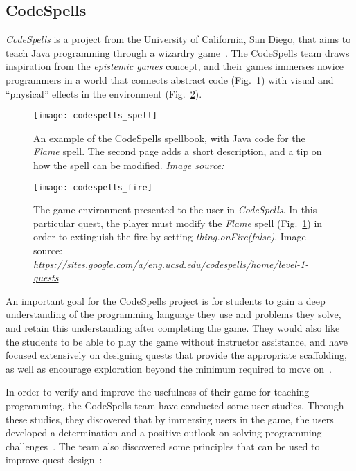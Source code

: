 \subsection{CodeSpells}
\label{sec:codespells}
\emph{CodeSpells} is a project from the University of California, San Diego, that aims to teach Java programming through a wizardry game~\cite{esper:codespells}. The CodeSpells team draws inspiration from the \emph{epistemic games} concept, and their games immerses novice programmers in a world that connects abstract code (Fig.~\ref{fig:codespells_spell}) with visual and ``physical'' effects in the environment (Fig.~\ref{fig:codespells_fire}).

\begin{figure}[htp]
	\centering
	\texttt{[image: codespells\_spell]}
	\caption[Java code for a CodeSpells spell]{An example of the CodeSpells spellbook, with Java code for the \emph{Flame} spell. The second page adds a short description, and a tip on how the spell can be modified. \emph{Image source:~\cite{esper:codespells}}}
	\label{fig:codespells_spell}
\end{figure}

\begin{figure}[htp]
	\centering
	\texttt{[image: codespells\_fire]}
	\caption[The CodeSpells game environment]{The game environment presented to the user in \emph{CodeSpells}. In this particular quest, the player must modify the \emph{Flame} spell (Fig.~\ref{fig:codespells_spell}) in order to extinguish the fire by setting \emph{thing.onFire(false)}. Image source: \emph{\url{https://sites.google.com/a/eng.ucsd.edu/codespells/home/level-1-quests}}}
	\label{fig:codespells_fire}
\end{figure}

\noindent
An important goal for the CodeSpells project is for students to gain a deep understanding of the programming language they use and problems they solve, and retain this understanding after completing the game. They would also like the students to be able to play the game without instructor assistance, and have focused extensively on designing quests that provide the appropriate scaffolding, as well as encourage exploration beyond the minimum required to move on~\cite{esper:design_quests_java_concepts}.

\noindent
In order to verify and improve the usefulness of their game for teaching programming, the CodeSpells team have conducted some user studies. Through these studies, they discovered that by immersing users in the game, the users developed a determination and a positive outlook on solving programming challenges~\cite{esper:codespells}. The team also discovered some principles that can be used to improve quest design~\cite{esper:design_quests_java_concepts}:

